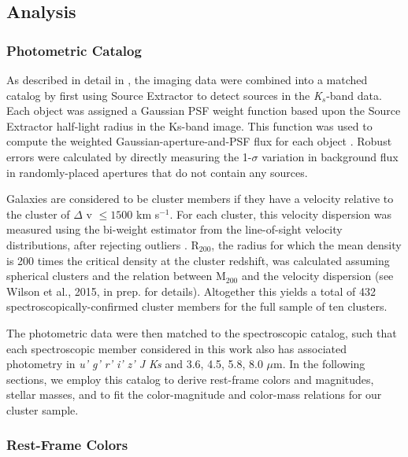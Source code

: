 \subsection{Analysis}\label{analysis}

\subsubsection{Photometric Catalog}\label{sec-catalog}

As described in detail in \citet{van-der-Burg:2013zn}, the imaging data were combined into a matched catalog by first using Source Extractor to detect sources in the \textit{K$_s$}-band data. Each object was assigned a Gaussian PSF weight function based upon the Source Extractor half-light radius in the Ks-band image. This function was used to compute the weighted Gaussian-aperture-and-PSF flux for each object \citep{Kuijken:2008vf}. Robust errors were calculated by directly measuring the 1-$\sigma$ variation in background flux in randomly-placed apertures that do not contain any sources.

Galaxies are considered to be cluster members if they have a velocity relative to the cluster of $\Delta$ v $\le 1500$ km s$^{-1}$. For each cluster, this velocity dispersion was measured using the bi-weight estimator \citep{Beers:1990bf}
from the line-of-sight velocity distributions, after rejecting outliers \citep{Girardi:1993ud,Fadda:1996kk}. R$_{200}$, the radius for which the mean density is 200 times the critical density at the cluster redshift, was calculated assuming spherical clusters and the \citet{Evrard:2008lr} relation between $\mathrm{M}_{200}$ and the velocity dispersion (see Wilson et al., 2015, in prep. for details). Altogether this yields a total of 432 spectroscopically-confirmed cluster members for the full sample of ten clusters.


The photometric data were then matched to the spectroscopic catalog, such that each spectroscopic member considered in this work also has associated photometry in \textit{u' g' r' i' z' J Ks } and 3.6, 4.5, 5.8, 8.0 $\mu$m. In the following sections, we employ this catalog to derive rest-frame colors and magnitudes, stellar masses, and to fit the color-magnitude and color-mass relations for our cluster sample.

\subsubsection{Rest-Frame Colors}\label{sec-rest_frame_color}

